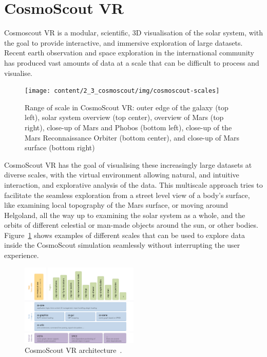 \section{CosmoScout VR}\label{sec:cosmoscout-vr}

Cosmoscout VR is a modular, scientific, 3D visualisation of the solar system, with the goal to provide interactive,
and immersive exploration of large datasets.
Recent earth observation and space exploration in the international community has produced vast amounts of data at a
scale that can be difficult to process and visualise.

\begin{figure}[h]
    \centering
    \texttt{[image: content/2\_3\_cosmoscout/img/cosmoscout-scales]}
    \caption{Range of scale in CosmoScout VR: outer edge of the galaxy (top left), solar system overview (top center),
        overview of Mars (top right), close-up of Mars and Phobos (bottom left), close-up of the Mars Reconnaissance
        Orbiter (bottom center), and close-up of Mars surface (bottom right)~\cite{DLRmagazin2019}}
    \label{fig:cosmoscout-scales}
\end{figure}

CosmoScout VR has the goal of visualising these increasingly large datasets at diverse scales, with the virtual
environment allowing natural, and intuitive interaction, and explorative analysis of the data.
This multiscale approach tries to facilitate the seamless exploration from a street level view of a body's surface,
like examining local topography of the Mars surface, or moving around Helgoland, all the way up to examining the
solar system as a whole, and the orbits of different celestial or man-made objects around the sun, or other bodies.
Figure~\ref{fig:cosmoscout-scales} shows examples of different scales that can be used to explore data inside the
CosmoScout simulation seamlessly without interrupting the user experience.

\begin{figure}
    \centering
    \includegraphics[width=0.5\textwidth]{content/2_3_cosmoscout/img/cosmoscout-architecture}
    \caption{CosmoScout VR architecture~\cite{CSVR}.}
    \label{fig:cosmoscout-architecture}
\end{figure}

